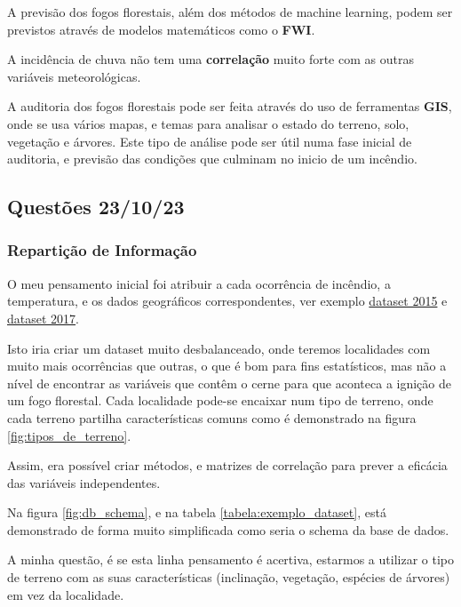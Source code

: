 \documentclass{article}
\begin{document}
A previsão dos fogos florestais, além dos métodos de machine learning, podem ser previstos através de modelos matemáticos como o \textbf{FWI}.


A incidência de chuva não tem uma \textbf{correlação} muito forte com as outras variáveis meteorológicas.


A auditoria dos fogos florestais pode ser feita através do uso de ferramentas \textbf{GIS}, onde se usa vários mapas, e temas para analisar o estado do terreno, solo, vegetação e árvores. Este tipo de análise pode ser útil numa fase inicial de auditoria, e previsão das condições que culminam no inicio de um incêndio.


\subsection{Questões 23/10/23}

\subsubsection{Repartição de Informação}
O meu pensamento inicial foi atribuir a cada ocorrência de incêndio, a temperatura, e os dados geográficos correspondentes, ver exemplo \href{https://drive.google.com/file/d/13fw-uWtUAH4MEGPvmtnrrzJ5M7Pa4_cf/view?usp=sharing}{dataset 2015} e \href{https://drive.google.com/file/d/14O13kv_9zqOzVZgREm5C9k1rYZwEg72l/view?usp=sharing}{dataset 2017}.


Isto iria criar um dataset muito desbalanceado, onde teremos localidades com muito mais ocorrências que outras, o que é bom para fins estatísticos, mas não a nível de encontrar as variáveis que contêm o cerne para que aconteca a ignição de um fogo florestal.
Cada localidade pode-se encaixar num tipo de terreno, onde cada terreno partilha características comuns como é demonstrado na figura \ref{fig:tipos_de_terreno}.


Assim, era possível criar métodos, e matrizes de correlação para prever a eficácia das variáveis independentes.


Na figura \ref{fig:db_schema}, e na tabela \ref{tabela:exemplo_dataset}, está demonstrado de forma muito simplificada como seria o schema da base de dados.


A minha questão, é se esta linha pensamento é acertiva, estarmos a utilizar o tipo de terreno com as suas características (inclinação, vegetação, espécies de árvores) em vez da localidade.
\end{document}
